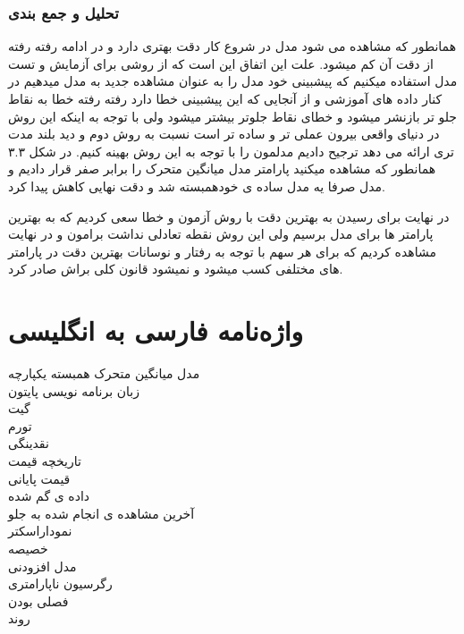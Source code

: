 \documentclass[12pt]{report}
\begin{document}
\subsection{تحلیل و جمع بندی}
همانطور که مشاهده می شود مدل در شروع کار دقت بهتری دارد و در ادامه رفته رفته از دقت آن کم میشود. علت این اتفاق این است که از روشی برای آزمایش و تست مدل استفاده میکنیم که پیشبینی خود مدل را به عنوان مشاهده جدید به مدل میدهیم در کنار داده های آموزشی و از آنجایی که این پیشبینی خطا دارد رفته رفته خطا به نقاط جلو تر بازنشر میشود و خطای نقاط جلوتر بیشتر میشود ولی با توجه به اینکه این روش در دنیای واقعی بیرون عملی تر و ساده تر است نسبت به روش دوم و دید بلند مدت تری ارائه می دهد ترجیح دادیم مدلمون را با توجه به این روش بهینه کنیم. 
در شکل ۳.۳ همانطور که مشاهده میکنید پارامتر مدل میانگین متحرک را برابر صفر قرار دادیم و مدل صرفا یه مدل ساده ی خودهمبسته شد و دقت نهایی کاهش پیدا کرد.
\par
در نهایت برای رسیدن به بهترین دقت با روش آزمون و خطا سعی کردیم که به بهترین پارامتر ها برای مدل برسیم ولی این روش نقطه تعادلی نداشت برامون و در نهایت مشاهده کردیم که برای هر سهم با توجه به رفتار و نوسانات بهترین دقت در پارامتر های مختلفی کسب میشود و نمیشود قانون کلی براش صادر کرد.


\chapter*{واژه‌نامه فارسی به انگلیسی}
مدل میانگین متحرک همبسته یکپارچه
\dotfill {} \\
زبان برنامه نویسی پایتون 
\dotfill {} \\
 گیت
\dotfill {} \\
تورم
\dotfill {} \\
نقدینگی
\dotfill {} \\
تاریخچه قیمت
\dotfill {} \\
قیمت پایانی
\dotfill {} \\
داده ی گم شده
\dotfill {} \\
آخرین مشاهده ی انجام شده به جلو
\dotfill {} \\
نموداراسکتر
\dotfill {} \\
خصیصه
\dotfill {} \\
مدل افزودنی
\dotfill {} \\
رگرسیون ناپارامتری
\dotfill {} \\
فصلی بودن
\dotfill {} \\
روند
\dotfill {} \\
\end{document}

